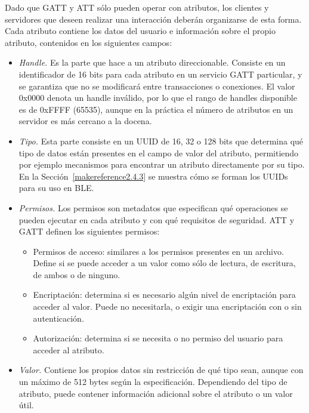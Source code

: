 Dado que GATT y ATT sólo pueden operar con atributos, los clientes y servidores que deseen realizar una interacción deberán organizarse de esta forma. Cada atributo contiene los datos del usuario e información sobre el propio atributo, contenidos en los siguientes campos:
\begin{itemize}
	\item \textit{Handle.} Es la parte que hace a un atributo direccionable. Consiste en un identificador de 16 bits para cada atributo en un servicio GATT particular, y se garantiza que no se modificará entre transacciones o conexiones.  El valor 0x0000 denota un handle inválido, por lo que el rango de handles disponible es de 0xFFFF (65535), aunque en la práctica el número de atributos en un servidor es más cercano a la docena.

	\item \textit{Tipo.} Esta parte consiste en un UUID de 16, 32 o 128 bits que determina qué tipo de datos están presentes en el campo de valor del atributo, permitiendo por ejemplo mecanismos para encontrar un atributo directamente por su tipo. En la Sección~\ref{makereference2.4.3} se muestra cómo se forman los UUIDs para su uso en BLE.

	\item \textit{Permisos.} Los permisos son metadatos que especifican qué operaciones se pueden ejecutar en cada atributo y con qué requisitos de seguridad. ATT y GATT definen los siguientes permisos:
	\begin{itemize}
		\item Permisos de acceso: similares a los permisos presentes en un archivo.  Define si se puede acceder a un valor como sólo de lectura, de escritura, de ambos o de ninguno.
		\item Encriptación: determina si es necesario algún nivel de encriptación para acceder al valor. Puede no necesitarla, o exigir una encriptación con o sin autenticación.
		\item Autorización: determina si se necesita o no permiso del usuario para acceder al atributo.
	\end{itemize}

	\item \textit{Valor.} Contiene los propios datos sin restricción de qué tipo sean, aunque con un máximo de 512 bytes según la especificación. Dependiendo del tipo de atributo, puede contener información adicional sobre el atributo o un valor útil.
\end{itemize}

